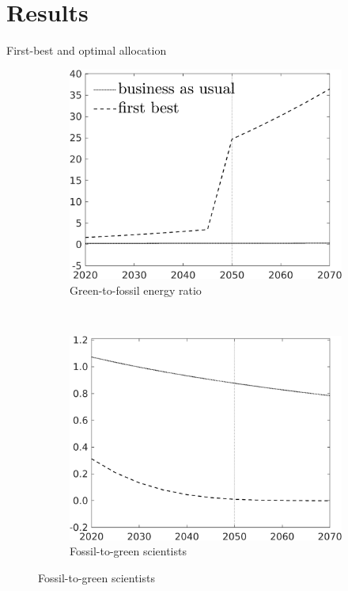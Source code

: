 \documentclass[11pt,aspectratio=169]{beamer}
\begin{document}
	\section{Results}
\begin{frame}{First-best and optimal allocation}
	\pause
	\begin{figure}[h!!]
		\centering
		\begin{subfigure}{0.45\textwidth}		
			\caption{{Green-to-fossil energy ratio}}
			\includegraphics[width=1\textwidth]{../codding_model/own_basedOnFried/optimalPol_010922_revision/figures/all_13Sept22/NewCalib_effBAU_T_GFF_Sun2_emnet1_spillover0_knspil3_xgr0_nsk0_sep0_extern0_PV1_etaa0.79_lgd1.png}
		\end{subfigure}
		\begin{minipage}[]{0.05\textwidth}
			\
		\end{minipage}
		\begin{subfigure}{0.45\textwidth}		
			\caption{{Fossil-to-green scientists}}
			\includegraphics[width=1\textwidth]{../codding_model/own_basedOnFried/optimalPol_010922_revision/figures/all_13Sept22/NewCalib_effBAU_T_sffsg_Sun2_emnet1_spillover0_knspil3_xgr0_nsk0_sep0_extern0_PV1_etaa0.79_lgd0.png}

\end{subfigure}
\end{figure}
\end{frame}
\end{document}
